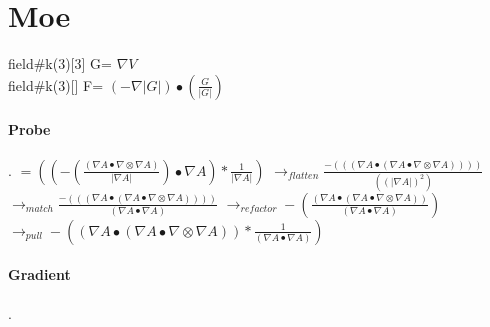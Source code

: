 \documentclass{article}
\begin{document}
 \section{Moe}
   field\#k(3)[3] G= $\nabla V$\\
 field\#k(3)[] F= $(-\nabla|G|)\bullet(\frac{G}{|G|})$
 \paragraph{Probe} . 
$= ((-( \frac{( \nabla A \bullet  \nabla  \otimes  \nabla A)}{| \nabla A|}) \bullet  \nabla A)* \frac{1}{| \nabla A|})$
\newline $\rightarrow_{flatten} \frac{-((( \nabla A \bullet ( \nabla A \bullet  \nabla  \otimes  \nabla A))))}{((| \nabla A|)^2)}$
\newline $\rightarrow_{match} \frac{-((( \nabla A \bullet ( \nabla A \bullet  \nabla  \otimes  \nabla A))))}{( \nabla A \bullet  \nabla A)}$
\newline $\rightarrow_{refactor}-( \frac{( \nabla A \bullet ( \nabla A \bullet  \nabla  \otimes  \nabla A))}{( \nabla A \bullet  \nabla A)})$
\newline $\rightarrow_{pull}-(( \nabla A \bullet ( \nabla A \bullet  \nabla  \otimes  \nabla A))* \frac{1}{( \nabla A \bullet  \nabla A)})$


\paragraph{Gradient}.
 
\end{document}
